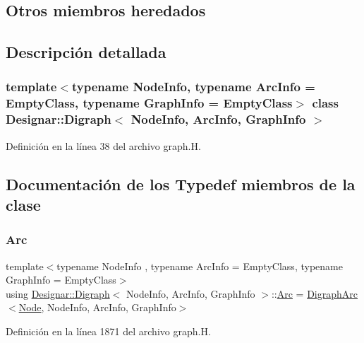 \subsection*{Otros miembros heredados}


\subsection{Descripción detallada}
\subsubsection*{template$<$typename Node\+Info, typename Arc\+Info = Empty\+Class, typename Graph\+Info = Empty\+Class$>$\newline
class Designar\+::\+Digraph$<$ Node\+Info, Arc\+Info, Graph\+Info $>$}



Definición en la línea 38 del archivo graph.\+H.



\subsection{Documentación de los \textquotesingle{}Typedef\textquotesingle{} miembros de la clase}
\mbox{\label{class_designar_1_1_digraph_a0ceb278671f2a535c00fddccdeafd69f}} 
\subsubsection{\texorpdfstring{Arc}{Arc}}
{\footnotesize\ttfamily template$<$typename Node\+Info , typename Arc\+Info  = Empty\+Class, typename Graph\+Info  = Empty\+Class$>$ \\
using \hyperlink{class_designar_1_1_digraph}{Designar\+::\+Digraph}$<$ Node\+Info, Arc\+Info, Graph\+Info $>$\+::\hyperlink{class_designar_1_1_digraph_a0ceb278671f2a535c00fddccdeafd69f}{Arc} =  \hyperlink{class_designar_1_1_digraph_arc}{Digraph\+Arc}$<$\hyperlink{class_designar_1_1_digraph_a4dc921c41a480b7946a04170e997d8ae}{Node}, Node\+Info, Arc\+Info, Graph\+Info$>$}



Definición en la línea 1871 del archivo graph.\+H.

\mbox{\label{class_designar_1_1_digraph_a84a736f6c32da0fcbd1d047e74264d00}} 

